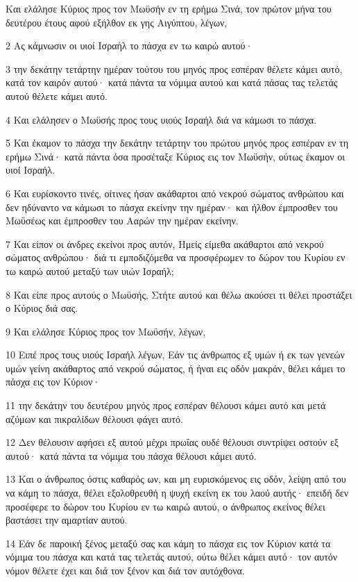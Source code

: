 \par Και ελάλησε Κύριος προς τον Μωϋσήν εν τη ερήμω Σινά, τον πρώτον μήνα του δευτέρου έτους αφού εξήλθον εκ γης Αιγύπτου, λέγων,
\par 2 Ας κάμνωσιν οι υιοί Ισραήλ το πάσχα εν τω καιρώ αυτού·
\par 3 την δεκάτην τετάρτην ημέραν τούτου του μηνός προς εσπέραν θέλετε κάμει αυτό, κατά τον καιρόν αυτού· κατά πάντα τα νόμιμα αυτού και κατά πάσας τας τελετάς αυτού θέλετε κάμει αυτό.
\par 4 Και ελάλησεν ο Μωϋσής προς τους υιούς Ισραήλ διά να κάμωσι το πάσχα.
\par 5 Και έκαμον το πάσχα την δεκάτην τετάρτην του πρώτου μηνός προς εσπέραν εν τη ερήμω Σινά· κατά πάντα όσα προσέταξε Κύριος εις τον Μωϋσήν, ούτως έκαμον οι υιοί Ισραήλ.
\par 6 Και ευρίσκοντο τινές, οίτινες ήσαν ακάθαρτοι από νεκρού σώματος ανθρώπου και δεν ηδύναντο να κάμωσι το πάσχα εκείνην την ημέραν· και ήλθον έμπροσθεν του Μωϋσέως και έμπροσθεν του Ααρών την ημέραν εκείνην.
\par 7 Και είπον οι άνδρες εκείνοι προς αυτόν, Ημείς είμεθα ακάθαρτοι από νεκρού σώματος ανθρώπου· διά τι εμποδιζόμεθα να προσφέρωμεν το δώρον του Κυρίου εν τω καιρώ αυτού μεταξύ των υιών Ισραήλ;
\par 8 Και είπε προς αυτούς ο Μωϋσής, Στήτε αυτού και θέλω ακούσει τι θέλει προστάξει ο Κύριος διά σας.
\par 9 Και ελάλησε Κύριος προς τον Μωϋσήν, λέγων,
\par 10 Ειπέ προς τους υιούς Ισραήλ λέγων, Εάν τις άνθρωπος εξ υμών ή εκ των γενεών υμών γείνη ακάθαρτος από νεκρού σώματος, ή ήναι εις οδόν μακράν, θέλει κάμει το πάσχα εις τον Κύριον·
\par 11 την δεκάτην του δευτέρου μηνός προς εσπέραν θέλουσι κάμει αυτό και μετά αζύμων και πικραλίδων θέλουσι φάγει αυτό.
\par 12 Δεν θέλουσιν αφήσει εξ αυτού μέχρι πρωΐας ουδέ θέλουσι συντρίψει οστούν εξ αυτού· κατά πάντα τα νόμιμα του πάσχα θέλουσι κάμει αυτό.
\par 13 Και ο άνθρωπος όστις καθαρός ων, και μη ευρισκόμενος εις οδόν, λείψη από του να κάμη το πάσχα, θέλει εξολοθρευθή η ψυχή εκείνη εκ του λαού αυτής· επειδή δεν προσέφερε το δώρον του Κυρίου εν τω καιρώ αυτού, ο άνθρωπος εκείνος θέλει βαστάσει την αμαρτίαν αυτού.
\par 14 Εάν δε παροική ξένος μεταξύ σας και κάμη το πάσχα εις τον Κύριον κατά τα νόμιμα του πάσχα και κατά τας τελετάς αυτού, ούτω θέλει κάμει αυτό· τον αυτόν νόμον θέλετε έχει και διά τον ξένον και διά τον αυτόχθονα.
